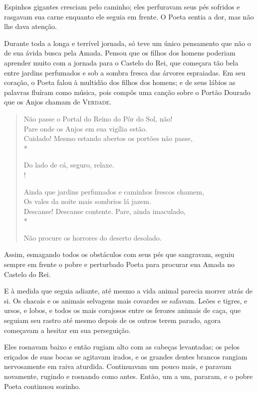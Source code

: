 Espinhos gigantes cresciam pelo caminho; eles perfuravam seus pés
sofridos e rasgavam sua carne enquanto ele seguia em frente. O Poeta
sentia a dor, mas não lhe dava atenção.

Durante toda a longa e terrível jornada, só teve um único pensamento
que não o de sua ávida busca pela Amada. Pensou que os filhos dos
homens poderiam aprender muito com a jornada para o Castelo do Rei, que
começara tão bela entre jardins perfumados e sob a sombra fresca das
árvores espraiadas. Em seu coração, o Poeta falou à multidão dos filhos
dos homens; e de seus lábios as palavras fluíram como música, pois
compôs uma canção sobre o Portão Dourado que os Anjos chamam de
\textsc{Verdade}.

\begin{verse}
Não passe o Portal do Reino do Pôr do Sol, não!\\

Pare onde os Anjos em sua vigília estão.\\

Cuidado! Mesmo estando abertos os portões não passe,\\*

Do lado de cá, seguro, relaxe.\\!

Ainda que jardins perfumados e caminhos frescos chamem,\\

Os vales da noite mais sombrios lá jazem.\\

Descanse! Descanse contente. Pare, ainda imaculado,\\*

Não procure os horrores do deserto desolado.\\
\end{verse}

Assim, esmagando todos os obstáculos com seus pés que sangravam, seguiu
sempre em frente o pobre e perturbado Poeta para procurar sua Amada no
Castelo do Rei.

E à medida que seguia adiante, até mesmo a vida animal parecia morrer
atrás de si. Os chacais e os animais selvagens mais covardes se safavam.
Leões e tigres, e ursos, e lobos, e todos os mais corajosos entre os
ferozes animais de caça, que seguiam seu rastro até mesmo depois de os
outros terem parado, agora começavam a hesitar em sua perseguição.

Eles rosnavam baixo e então rugiam alto com as cabeças levantadas; os
pelos eriçados de suas bocas se agitavam irados, e os grandes dentes
brancos rangiam nervosamente em raiva aturdida. Continuavam
um pouco mais, e paravam novamente, rugindo e rosnando como antes.
Então, um a um, pararam, e o pobre Poeta continuou sozinho.

